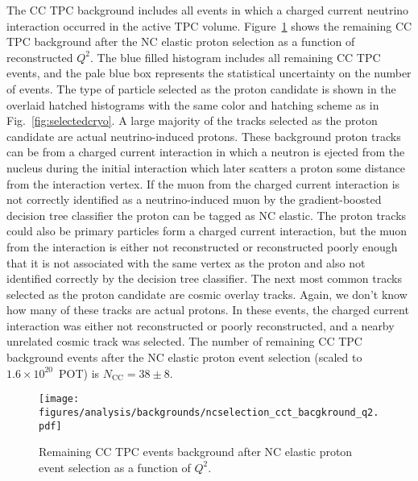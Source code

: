     The CC TPC background includes all events in which a charged current
    neutrino interaction occurred in the active TPC volume.
    Figure~\ref{fig:selectedcctpc} shows the remaining CC TPC background after
    the NC elastic proton selection as a function of reconstructed $Q^2$. The
    blue filled histogram includes all remaining CC TPC events, and the pale
    blue box represents the statistical uncertainty on the number of events.
    The type of particle selected as the proton candidate is shown in the
    overlaid hatched histograms with the same color and hatching scheme as in
    Fig.~\ref{fig:selectedcryo}. A large majority of the tracks selected as the
    proton candidate are actual neutrino-induced protons. These background
    proton tracks can be from a charged current interaction in which a neutron is
    ejected from the nucleus during the initial interaction which later
    scatters a proton some distance from the interaction vertex. If the muon
    from the charged current interaction is not correctly identified as a
    neutrino-induced muon by the gradient-boosted decision tree classifier the
    proton can be tagged as NC elastic. The proton tracks could also be primary
    particles form a charged current interaction, but the muon from the
    interaction is either not reconstructed or reconstructed poorly enough that
    it is not associated with the same vertex as the proton and also not
    identified correctly by the decision tree classifier. The next most common
    tracks selected as the proton candidate are cosmic overlay tracks. Again,
    we don't know how many of these tracks are actual protons. In these events,
    the charged current interaction was either not reconstructed or poorly
    reconstructed, and a nearby unrelated cosmic track was selected. The number
    of remaining CC TPC background events after the NC elastic proton event
    selection (scaled to $1.6\times 10^{20}$~POT) is $N_{\textrm{CC}} = 38
    \pm 8$.
    \begin{figure}[ht]
      \centering
      \texttt{[image: figures/analysis/backgrounds/ncselection\_cct\_bacgkround\_q2.pdf]}
      \caption{Remaining CC TPC events background after NC elastic proton event
      selection as a function of $Q^2$.}
      \label{fig:selectedcctpc}
    \end{figure}

